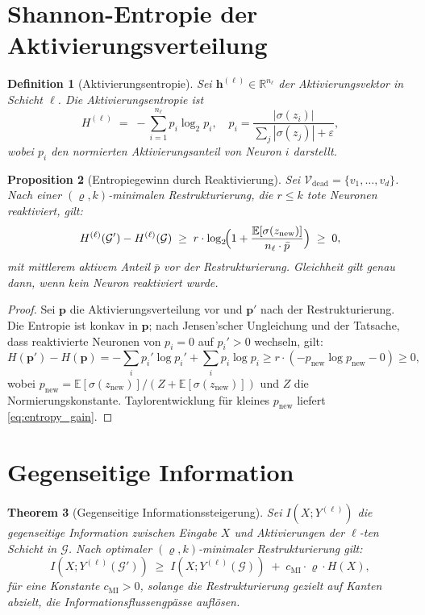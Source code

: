 ﻿\documentclass[12pt, a4paper, openany]{report}
\newtheorem{theorem}{Theorem}[chapter]
\newtheorem{proposition}[theorem]{Proposition}
\newtheorem{definition}[theorem]{Definition}
\newcommand{\R}{\mathbb{R}}
\newcommand{\E}{\mathbb{E}}
\newcommand{\calG}{\mathcal{G}}
\newcommand{\calV}{\mathcal{V}}
\newcommand{\eps}{\varepsilon}
\begin{document}
\section{Shannon-Entropie der Aktivierungsverteilung}

\begin{definition}[Aktivierungsentropie]
Sei $\bm{h}^{(\ell)} \in \R^{n_\ell}$ der Aktivierungsvektor in Schicht
$\ell$.  Die \emph{Aktivierungsentropie} ist
\[
  H^{(\ell)} \;=\; -\sum_{i=1}^{n_\ell} p_i \log_2 p_i,
  \quad p_i = \frac{|\sigma(z_i)|}{\sum_j |\sigma(z_j)| + \eps},
\]
wobei $p_i$ den normierten Aktivierungsanteil von Neuron $i$ darstellt.
\end{definition}

\begin{proposition}[Entropiegewinn durch Reaktivierung]
\label{prop:entropy}
Sei $\calV_{\mathrm{dead}} = \{v_1, \ldots, v_d\}$.  Nach einer
$(\varrho, k)$-minimalen Restrukturierung, die $r \leq k$ tote Neuronen
reaktiviert, gilt:
\begin{equation}
  \label{eq:entropy_gain}
  H^{(\ell)}(\calG') - H^{(\ell)}(\calG)
  \;\geq\;
  r \cdot \log_2\!\Bigl(1 + \frac{\E[\sigma(z_{\mathrm{new}})]}{n_\ell \cdot \bar{p}}\Bigr)
  \;\geq\; 0,
\end{equation}
mit mittlerem aktivem Anteil $\bar{p}$ vor der Restrukturierung.
Gleichheit gilt genau dann, wenn kein Neuron reaktiviert wurde.
\end{proposition}

\begin{proof}
Sei $\bm{p}$ die Aktivierungsverteilung vor und $\bm{p}'$ nach der
Restrukturierung.  Die Entropie ist konkav in $\bm{p}$; nach
Jensen'scher Ungleichung und der Tatsache, dass reaktivierte Neuronen
von $p_i = 0$ auf $p_i' > 0$ wechseln, gilt:
\[
  H(\bm{p}') - H(\bm{p})
  = -\sum_i p_i' \log p_i' + \sum_i p_i \log p_i
  \geq r \cdot (-p_{\mathrm{new}} \log p_{\mathrm{new}} - 0)
  \geq 0,
\]
wobei $p_{\mathrm{new}} = \E[\sigma(z_{\mathrm{new}})]/(Z + \E[\sigma(z_{\mathrm{new}})])$
und $Z$ die Normierungskonstante.  Taylorentwicklung für kleines
$p_{\mathrm{new}}$ liefert \eqref{eq:entropy_gain}.
\end{proof}

\section{Gegenseitige Information}

\begin{theorem}[Gegenseitige Informationssteigerung]
\label{thm:mutual_info}
Sei $I(X; Y^{(\ell)})$ die gegenseitige Information zwischen Eingabe $X$
und Aktivierungen der $\ell$-ten Schicht in $\calG$.
Nach optimaler $(\varrho, k)$-minimaler Restrukturierung gilt:
\begin{equation}
  \label{eq:mi_gain}
  I(X; Y^{(\ell)}(\calG')) \;\geq\; I(X; Y^{(\ell)}(\calG))
  \;+\; c_{\mathrm{MI}} \cdot \varrho \cdot H(X),
\end{equation}
für eine Konstante $c_{\mathrm{MI}} > 0$, solange die Restrukturierung
gezielt auf Kanten abzielt, die Informationsflussengpässe auflösen.
\end{theorem}
\end{document}
